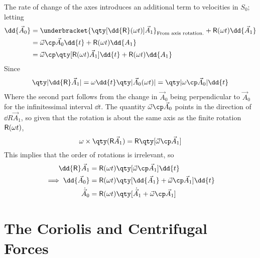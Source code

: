 The rate of change of the axes introduces an additional term to
velocities in $S_0$; letting
\begin{align*} 
\dd{\vec{A}_0} &= \underbracket{\qty[ \dd{\mat{R}}(\omega t) ] \vec{A}_1}_{\text{From axis rotation.}} + \mat{R}(\omega t) \dd{\vec{A}_1} \\
&= \vec{\omega} \cp \vec{A}_0 \dd{t} + \mat{R}(\omega t) \dd{A_1} \\
&= \vec{\omega} \cp \qty[ \mat{R}(\omega t) \vec{A}_1] \dd{t} + \mat{R}(\omega t) \dd{A_1}
\end{align*}
Since
\[ \qty| \dd{\mat{R}} \vec{A}_1| = \omega \dd{t} \qty|
\vec{A}_0(\omega t) | = \qty| \omega \cp \vec{A}_0 | \dd{t} \] Where
the second part follows from the change in $\vec{A}_0$ being
perpendicular to $\vec{A}_0$ for the infinitessimal interval $\dd{t}$.
The quantity $\vec{\omega} \cp \vec{A}_0$ points in the direction of
$\dd{R} \vec{A}_1$, so given that the rotation is about the same axis
as the finite rotation $\mathsf{R}(\omega t)$,
\[ \omega \times \qty( \mat{R} \vec{A}_1) = \mat{R} \qty[ \vec{\omega}
\cp \vec{A}_1] \] This implies that the order of rotations is
irrelevant, so
\begin{align}
  \dd{\mat{R}} \vec{A}_1 &= \mat{R}(\omega t) \qty[ \vec{\omega} \cp \vec{A}_1] \dd{t} \nonumber \\
\implies \dd{\vec{A}_0} &= \mat{R}(\omega t) \qty[ \dd{\vec{A}_1} + \vec{\omega} \cp \vec{A}_1] \dd{t} \nonumber \\
\label{eq:2}
\dot{\vec{A}}_0 &= \mat{R}( \omega t ) \qty[ \dot{\vec{A}}_1 + \vec{\omega} \cp \vec{A}_1 ]
\end{align}

\section{The Coriolis and Centrifugal Forces}
\label{sec:cori-centr-forc}

